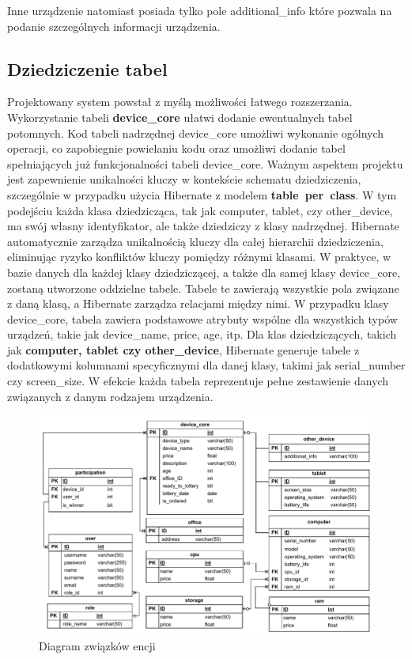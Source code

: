 Inne urządzenie natomiast posiada tylko pole additional\_info które pozwala na podanie szczególnych informacji urządzenia.

\subsection{Dziedziczenie tabel}
\label{dzedziczenie_hibernate:label}
Projektowany system powstał z myślą możliwości łatwego rozszerzania. Wykorzystanie tabeli \textbf{device\_core} ułatwi dodanie ewentualnych tabel potomnych. Kod tabeli nadrzędnej device\_core umożliwi wykonanie ogólnych operacji, co zapobiegnie powielaniu kodu oraz umożliwi dodanie tabel spełniających już funkcjonalności tabeli device\_core. Ważnym aspektem projektu jest zapewnienie unikalności kluczy w kontekście schematu dziedziczenia, szczególnie w przypadku użycia Hibernate z modelem \textbf{table~per~class}. W tym podejściu każda klasa dziedzicząca, tak jak computer, tablet, czy other\_device, ma swój własny identyfikator, ale także dziedziczy z klasy nadrzędnej. Hibernate automatycznie zarządza unikalnością kluczy dla całej hierarchii dziedziczenia, eliminując ryzyko konfliktów kluczy pomiędzy różnymi klasami. W praktyce, w bazie danych dla każdej klasy dziedziczącej, a także dla samej klasy device\_core, zostaną utworzone oddzielne tabele. Tabele te zawierają wszystkie pola związane z daną klasą, a Hibernate zarządza relacjami między nimi. W przypadku klasy device\_core, tabela zawiera podstawowe atrybuty wspólne dla wszystkich typów urządzeń, takie jak device\_name, price, age, itp.
\newline
Dla klas dziedziczących, takich jak \textbf{computer, tablet czy other\_device}, Hibernate generuje tabele z dodatkowymi kolumnami specyficznymi dla danej klasy, takimi jak serial\_number czy screen\_size. W efekcie każda tabela reprezentuje pełne zestawienie danych związanych z danym rodzajem urządzenia.


\begin{figure}[h]
    \includegraphics[width=\linewidth]{rys04/ER_Diagram.pdf}
    \caption{Diagram związków encji}
    \label{ErDiagram_etykieta}
\end{figure}


